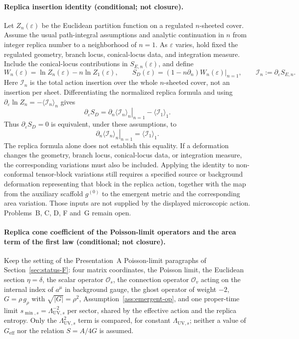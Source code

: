 \paragraph{Replica insertion identity (conditional; not closure).}
Let \(Z_n(\varepsilon)\) be the Euclidean partition function on a
regulated \(n\)-sheeted cover. Assume the usual path-integral assumptions
and analytic continuation in \(n\) from integer replica number to a
neighborhood of \(n=1\). As \(\varepsilon\) varies, hold fixed the
regulated geometry, branch locus, conical-locus data, and integration
measure. Include the conical-locus contributions in
\(S_{E,n}(\varepsilon)\), and define
\[
W_n(\varepsilon)=\ln Z_n(\varepsilon)-n\ln Z_1(\varepsilon),
\qquad
S_D(\varepsilon)
=(1-n\partial_n)W_n(\varepsilon)\big|_{n=1},
\qquad
\mathcal I_n:=\partial_\varepsilon S_{E,n}.
\]
Here \(\mathcal I_n\) is the total action insertion over the whole
\(n\)-sheeted cover, not an insertion per sheet. Differentiating the
normalized replica formula and using
\(\partial_\varepsilon\ln Z_n=-\langle\mathcal I_n\rangle_n\) gives
\[
\partial_\varepsilon S_D
=
\left.\partial_n\langle\mathcal I_n\rangle_n\right|_{n=1}
-\langle\mathcal I_1\rangle_1 .
\]
Thus \(\partial_\varepsilon S_D=0\) is equivalent, under these
assumptions, to
\[
\left.\partial_n\langle\mathcal I_n\rangle_n\right|_{n=1}
=\langle\mathcal I_1\rangle_1 .
\]
The replica formula alone does not establish this equality. If a
deformation changes the geometry, branch locus, conical-locus data, or
integration measure, the corresponding variations must also be included.
Applying the identity to non-conformal tensor-block variations still
requires a specified source or background deformation representing that
block in the replica action, together with the map from the auxiliary
scaffold \(g^{(0)}\) to the emergent metric and the corresponding area
variation. Those inputs are not supplied by the displayed microscopic
action. Problems~B, C, D, F and~G remain open.

\paragraph{Replica cone coefficient of the Poisson-limit operators and the area term of the first law (conditional; not closure).}
Keep the setting of the Presentation~A Poisson-limit paragraphs of Section~\ref{sec:status-F}: four matrix coordinates, the Poisson limit, the Euclidean section \(\eta=\delta\), the scalar operator \(\mathcal O_s\), the connection operator \(\mathcal O_v\) acting on the internal index of \(a^\mu\) in background gauge, the ghost operator of weight \(-2\), \(G=\rho\,g_\rho\) with \(\sqrt{|G|}=\rho^2\), Assumption~\ref{ass:emergent-op}, and one proper-time limit \(s_{\min,s}=\Lambda_{\mathrm{UV},s}^{-2}\) per sector, shared by the effective action and the replica entropy. Only the \(\Lambda_{\mathrm{UV},s}^2\) term is compared, for constant \(\Lambda_{\mathrm{UV},s}\); neither a value of \(G_{\mathrm{eff}}\) nor the relation \(S=A/4G\) is assumed.

